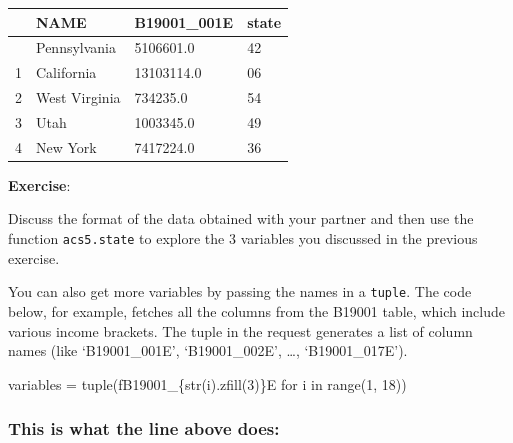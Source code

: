 \documentclass[
  letterpaper,
  DIV=11,
  numbers=noendperiod]{scrreprt}
\newenvironment{Shaded}{\begin{snugshade}}{\end{snugshade}}
\newcommand{\BuiltInTok}[1]{\textcolor[rgb]{0.00,0.23,0.31}{#1}}
\newcommand{\ControlFlowTok}[1]{\textcolor[rgb]{0.00,0.23,0.31}{#1}}
\newcommand{\DecValTok}[1]{\textcolor[rgb]{0.68,0.00,0.00}{#1}}
\newcommand{\KeywordTok}[1]{\textcolor[rgb]{0.00,0.23,0.31}{#1}}
\newcommand{\NormalTok}[1]{\textcolor[rgb]{0.00,0.23,0.31}{#1}}
\newcommand{\OperatorTok}[1]{\textcolor[rgb]{0.37,0.37,0.37}{#1}}
\newcommand{\SpecialCharTok}[1]{\textcolor[rgb]{0.37,0.37,0.37}{#1}}
\newcommand{\SpecialStringTok}[1]{\textcolor[rgb]{0.13,0.47,0.30}{#1}}
\begin{document}
\begin{longtable}[]{@{}llll@{}}
\toprule\noalign{}
& NAME & B19001\_001E & state \\
\midrule\noalign{}
\endhead
\bottomrule\noalign{}
\endlastfoot
0 & Pennsylvania & 5106601.0 & 42 \\
1 & California & 13103114.0 & 06 \\
2 & West Virginia & 734235.0 & 54 \\
3 & Utah & 1003345.0 & 49 \\
4 & New York & 7417224.0 & 36 \\
\end{longtable}

\textbf{Exercise}:

Discuss the format of the data obtained with your partner and then use
the function \texttt{acs5.state} to explore the 3 variables you
discussed in the previous exercise.

You can also get more variables by passing the names in a
\texttt{tuple}. The code below, for example, fetches all the columns
from the B19001 table, which include various income brackets. The tuple
in the request generates a list of column names (like `B19001\_001E',
`B19001\_002E', \ldots, `B19001\_017E').

\begin{Shaded}
\begin{Highlighting}[]
\NormalTok{variables }\OperatorTok{=} \BuiltInTok{tuple}\NormalTok{(}\SpecialStringTok{f\textquotesingle{}B19001\_}\SpecialCharTok{\{}\BuiltInTok{str}\NormalTok{(i)}\SpecialCharTok{.}\NormalTok{zfill(}\DecValTok{3}\NormalTok{)}\SpecialCharTok{\}}\SpecialStringTok{E\textquotesingle{}} \ControlFlowTok{for}\NormalTok{ i }\KeywordTok{in} \BuiltInTok{range}\NormalTok{(}\DecValTok{1}\NormalTok{, }\DecValTok{18}\NormalTok{))}
\end{Highlighting}
\end{Shaded}

\subsubsection{This is what the line above
does:}\label{this-is-what-the-line-above-does}
\end{document}
